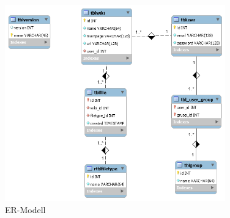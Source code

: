 \label{app:erm}
	
	\begin{figure}[H]
	\begin{center}
	\includegraphics[width=0.85\textwidth]{images/erm}	
	\caption{ER-Modell}	
	\end{center}
	\end{figure}
	

	